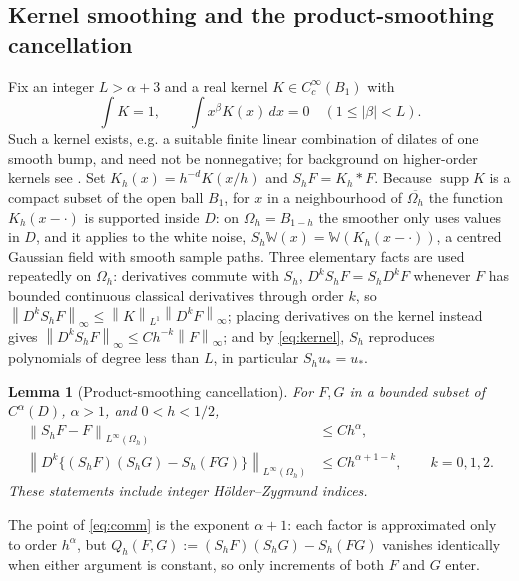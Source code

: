 \documentclass[12pt]{article}
\numberwithin{equation}{section}
\newtheorem{lemma}[theorem]{Lemma}
\newcommand{\norm}[1]{\left\|#1\right\|}
\newcommand{\supp}{\operatorname{supp}}
\begin{document}
\subsection{Kernel smoothing and the product-smoothing cancellation}\label{sec:smoothing}

Fix an integer $L>\alpha+3$ and a real kernel $K\in C_c^\infty(B_1)$
with
\begin{equation}\label{eq:kernel}
 \int K=1,\qquad \int x^\beta K(x)\,dx=0\quad(1\le|\beta|<L).
\end{equation}
Such a kernel exists, e.g. a suitable finite linear combination of
dilates of one smooth bump, and need not be nonnegative; for
background on higher-order kernels see \cite[Section 1.2.2]{Tsybakov}.
Set
$K_h(x)=h^{-d}K(x/h)$ and $S_hF=K_h*F$. Because
$\supp K$ is a compact subset of the open ball $B_1$, for $x$ in a
neighbourhood of $\overline{\Omega_h}$ the function $K_h(x-\cdot)$ is
supported inside $D$: on $\Omega_h=B_{1-h}$ the smoother only uses
values in $D$, and it applies to the white noise,
$S_h\mathbb W(x)=\mathbb W(K_h(x-\cdot))$, a centred Gaussian field
with smooth sample paths. Three elementary facts are used repeatedly
on $\Omega_h$: derivatives commute with $S_h$, $D^kS_hF=S_hD^kF$
whenever $F$ has bounded continuous classical derivatives through
order $k$, so $\norm{D^kS_hF}_\infty\le\norm K_{L^1}\norm{D^kF}_\infty$;
placing derivatives on the kernel instead gives
$\norm{D^kS_hF}_\infty\le Ch^{-k}\norm F_\infty$; and by
\eqref{eq:kernel}, $S_h$ reproduces polynomials of degree less than
$L$, in particular $S_hu_*=u_*$.

\begin{lemma}[Product-smoothing cancellation]\label{lem:comm}
For $F,G$ in a bounded subset of $C^\alpha(D)$, $\alpha>1$, and
$0<h<1/2$,
\begin{align}
 \norm{S_hF-F}_{L^\infty(\Omega_h)}&\le Ch^\alpha,
       \label{eq:approx}\\
 \norm{D^k\{(S_hF)(S_hG)-S_h(FG)\}}_{L^\infty(\Omega_h)}
       &\le Ch^{\alpha+1-k},\qquad k=0,1,2 .
       \label{eq:comm}
\end{align}
These statements include integer H\"older--Zygmund indices.
\end{lemma}

The point of \eqref{eq:comm} is the exponent $\alpha+1$: each factor is
approximated only to order $h^\alpha$, but
$Q_h(F,G):=(S_hF)(S_hG)-S_h(FG)$ vanishes identically when either
argument is constant, so only increments of both $F$ and $G$ enter.
\end{document}

